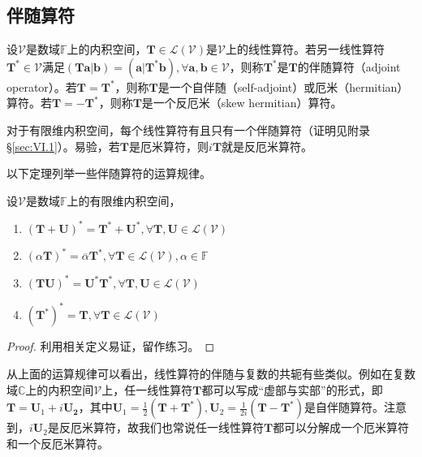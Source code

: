 \documentclass[main.tex]{subfiles}
\begin{document}
\subsection{伴随算符}
\begin{definition}[伴随算符]\label{def:II.6.1}
    设$\mathcal{V}$是数域$\mathbb{F}$上的内积空间，$\mathbf{T}\in\mathcal{L}\left(\mathcal{V}\right)$是$\mathcal{V}$上的线性算符。若另一线性算符$\mathbf{T}^*\in\mathcal{V}$满足$\left(\mathbf{Ta}|\mathbf{b}\right)=\left(\mathbf{a}|\mathbf{T}^*\mathbf{b}\right),\forall\mathbf{a},\mathbf{b}\in\mathcal{V}$，则称$\mathbf{T}^*$是$\mathbf{T}$的伴随算符（adjoint operator）。若$\mathbf{T}=\mathbf{T}^*$，则称$\mathbf{T}$是一个自伴随（self-adjoint）或厄米（hermitian）算符。若$\mathbf{T}=-\mathbf{T}^*$，则称$\mathbf{T}$是一个反厄米（skew hermitian）算符。
\end{definition}

对于有限维内积空间，每个线性算符有且只有一个伴随算符（证明见附录\S\ref{sec:VI.1}）。易验，若$\mathbf{T}$是厄米算符，则$i\mathbf{T}$就是反厄米算符。

以下定理列举一些伴随算符的运算规律。

\begin{theorem}\label{thm:II.6.1}
    设$\mathcal{V}$是数域$\mathbb{F}$上的有限维内积空间，
    \begin{enumerate}
        \item $\left(\mathbf{T}+\mathbf{U}\right)^*=\mathbf{T}^*+\mathbf{U}^*,\forall\mathbf{T},\mathbf{U}\in\mathcal{L}\left(\mathcal{V}\right)$
        \item $\left(\alpha\mathbf{T}\right)^*=\overline{\alpha}\mathbf{T}^*,\forall\mathbf{T}\in\mathcal{L}\left(\mathcal{V}\right),\alpha\in\mathbb{F}$
        \item $\left(\mathbf{TU}\right)^*=\mathbf{U}^*\mathbf{T}^*,\forall\mathbf{T},\mathbf{U}\in\mathcal{L}\left(\mathcal{V}\right)$
        \item $\left(\mathbf{T}^*\right)^*=\mathbf{T},\forall\mathbf{T}\in\mathcal{L}\left(\mathcal{V}\right)$
    \end{enumerate}
\end{theorem}
\begin{proof}
    利用相关定义易证，留作练习。
\end{proof}

从上面的运算规律可以看出，线性算符的伴随与复数的共轭有些类似。例如在复数域$\mathbb{C}$上的内积空间$\mathcal{V}$上，任一线性算符$\mathbf{T}$都可以写成“虚部与实部”的形式，即$\mathbf{T}=\mathbf{U}_1+i\mathbf{U_2}$，其中$\mathbf{U}_1=\frac{1}{2}\left(\mathbf{T}+\mathbf{T}^*\right),\mathbf{U}_2=\frac{1}{2i}\left(\mathbf{T}-\mathbf{T}^*\right)$是自伴随算符。注意到，$i\mathbf{U}_2$是反厄米算符，故我们也常说任一线性算符$\mathbf{T}$都可以分解成一个厄米算符和一个反厄米算符。
\end{document}
